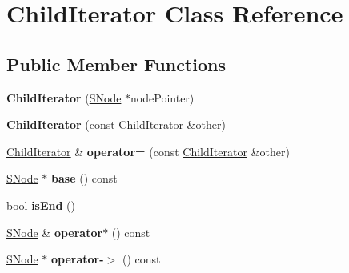 \hypertarget{classChildIterator}{}\section{Child\+Iterator Class Reference}
\label{classChildIterator}
\subsection*{Public Member Functions}
\begin{DoxyCompactItemize}
\item 
\mbox{\label{classChildIterator_a30779d81728eb74c087c28584d227aa5}} 
{\bfseries Child\+Iterator} (\mbox{\hyperlink{classSNode}{S\+Node}} $\ast$node\+Pointer)
\item 
\mbox{\label{classChildIterator_ad650e339469cd25417b270e1dcb89426}} 
{\bfseries Child\+Iterator} (const \mbox{\hyperlink{classChildIterator}{Child\+Iterator}} \&other)
\item 
\mbox{\label{classChildIterator_a648c29d92a62292b77269de9e27ecef1}} 
\mbox{\hyperlink{classChildIterator}{Child\+Iterator}} \& {\bfseries operator=} (const \mbox{\hyperlink{classChildIterator}{Child\+Iterator}} \&other)
\item 
\mbox{\label{classChildIterator_afd4164c8d7638042499c1428d300bdf3}} 
\mbox{\hyperlink{classSNode}{S\+Node}} $\ast$ {\bfseries base} () const
\item 
\mbox{\label{classChildIterator_a21d2ef1ba7894af707e43a1bd3e207b4}} 
bool {\bfseries is\+End} ()
\item 
\mbox{\label{classChildIterator_a996d8dce460d6ffed4cdff9c36bb2384}} 
\mbox{\hyperlink{classSNode}{S\+Node}} \& {\bfseries operator$\ast$} () const
\item 
\mbox{\label{classChildIterator_a71f1d1aa3122631484411e7fdb152a46}} 
\mbox{\hyperlink{classSNode}{S\+Node}} $\ast$ {\bfseries operator-\/$>$} () const
\item 
\mbox{\label{classChildIterator_a0dd1e2a3c8443f58003c8f5202e53d8a}} 

\end{DoxyCompactItemize}
